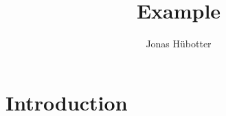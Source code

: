 \documentclass{article}
\title{Example}
\author{Jonas Hübotter}
\date{}
\begin{document}
\maketitle

\section{Introduction}
\end{document}
